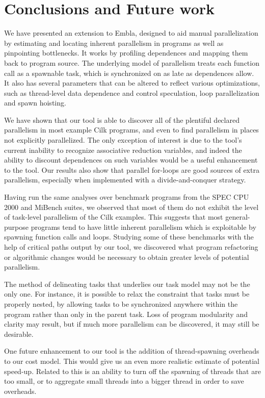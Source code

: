 \section{Conclusions and Future work}

We have presented an extension to Embla, designed to aid manual parallelization by estimating and locating inherent parallelism in programs as well as pinpointing bottlenecks.
It works by profiling dependences and mapping them back to program source.
The underlying model of parallelism treats each function call as a spawnable task, which is synchronized on as late as dependences allow.
It also has several parameters that can be altered to reflect various optimizations, such as thread-level data dependence and control speculation, loop parallelization and spawn hoisting.

We have shown that our tool is able to discover all of the plentiful declared parallelism in most example Cilk programs, and even to find parallelism in places not explicitly parallelized.
The only exception of interest is due to the tool's current inability to recognize associative reduction variables, and indeed the ability to discount dependences on such variables would be a useful enhancement to the tool.
Our results also show that parallel for-loops are good sources of extra parallelism, especially when implemented with a divide-and-conquer strategy.

Having run the same analyses over benchmark programs from the SPEC CPU 2000 and MiBench suites, we observed that most of them do not exhibit the level of task-level parallelism of the Cilk examples.
This suggests that most general-purpose programs tend to have little inherent parallelism which is exploitable by spawning function calls and loops.
Studying some of these benchmarks with the help of critical paths output by our tool, we discovered what program refactoring or algorithmic changes would be necessary to obtain greater levels of potential parallelism.

The method of delineating tasks that underlies our task model may not be the only one.
For instance, it is possible to relax the constraint that tasks must be properly nested, by allowing tasks to be synchronized anywhere within the program rather than only in the parent task.
Loss of program modularity and clarity may result, but if much more parallelism can be discovered, it may still be desirable.

One future enhancement to our tool is the addition of thread-spawning overheads to our cost model.
This would give us an even more realistic estimate of potential speed-up.
Related to this is an ability to turn off the spawning of threads that are too small, or to aggregate small threads into a bigger thread in order to save overheads.

